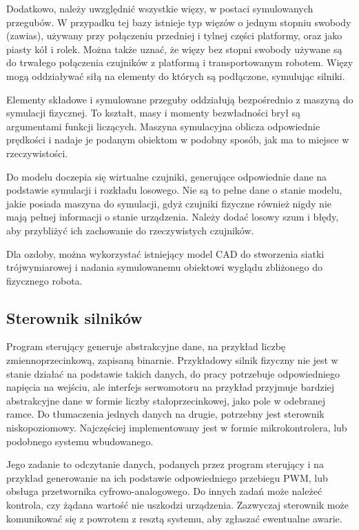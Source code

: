 		Dodatkowo, należy uwzględnić wszystkie więzy, w postaci symulowanych przegubów.
		W przypadku tej bazy istnieje typ więzów o jednym stopniu swobody (zawias), używany przy połączeniu przedniej i tylnej części platformy, oraz 
		jako piasty kół i rolek. Można także uznać, że więzy bez stopni swobody używane są do trwałego połączenia czujników z platformą i transportowanym robotem.
		Więzy mogą oddziaływać siłą na elementy do których są podłączone, symulując silniki.

		Elementy składowe i symulowane przeguby oddziałują bezpośrednio z maszyną do symulacji fizycznej. 
		To kształt, masy i momenty bezwładności brył są argumentami funkcji liczących.
		Maszyna symulacyjna oblicza odpowiednie prędkości i nadaje je podanym obiektom w podobny sposób, jak ma to miejsce w rzeczywistości.

		Do modelu doczepia się wirtualne czujniki, generujące odpowiednie dane na podstawie symulacji i rozkładu losowego.
		Nie są to pełne dane o stanie modelu, jakie posiada maszyna do symulacji, gdyż czujniki fizyczne również nigdy nie mają pełnej informacji o stanie urządzenia.
		Należy dodać losowy szum i błędy, aby przybliżyć ich zachowanie do rzeczywistych czujników.

		Dla ozdoby, można wykorzystać istniejący model CAD do stworzenia siatki trójwymiarowej i nadania symulowanemu obiektowi wyglądu zbliżonego do fizycznego robota.

	\subsection{Sterownik silników}
		Program sterujący generuje abstrakcyjne dane, na przykład liczbę zmiennoprzecinkową, zapisaną binarnie.
		Przykładowy silnik fizyczny nie jest w stanie działać na podstawie takich danych, do pracy potrzebuje odpowiedniego napięcia na wejściu,
		ale interfejs serwomotoru na przykład przyjmuje bardziej abstrakcyjne dane w formie liczby stałoprzecinkowej, jako pole w odebranej ramce.
		Do tłumaczenia jednych danych na drugie, potrzebny jest sterownik niskopoziomowy.
		Najczęściej implementowany jest w formie mikrokontrolera, lub podobnego systemu wbudowanego.

		Jego zadanie to odczytanie danych, podanych przez program sterujący i na przykład generowanie na ich podstawie odpowiedniego przebiegu PWM, lub obsługa przetwornika cyfrowo-analogowego.
		Do innych zadań może należeć kontrola, czy żądana wartość nie uszkodzi urządzenia.
		Zazwyczaj sterownik może komunikować się z powrotem z resztą systemu, aby zgłaszać ewentualne awarie.

